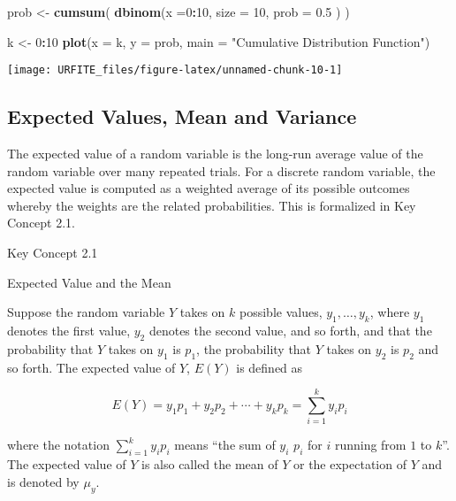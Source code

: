 \documentclass[]{book}
\newenvironment{Shaded}{\begin{snugshade}}{\end{snugshade}}
\newcommand{\KeywordTok}[1]{\textcolor[rgb]{0.13,0.29,0.53}{\textbf{#1}}}
\newcommand{\DataTypeTok}[1]{\textcolor[rgb]{0.13,0.29,0.53}{#1}}
\newcommand{\DecValTok}[1]{\textcolor[rgb]{0.00,0.00,0.81}{#1}}
\newcommand{\FloatTok}[1]{\textcolor[rgb]{0.00,0.00,0.81}{#1}}
\newcommand{\StringTok}[1]{\textcolor[rgb]{0.31,0.60,0.02}{#1}}
\newcommand{\OperatorTok}[1]{\textcolor[rgb]{0.81,0.36,0.00}{\textbf{#1}}}
\newcommand{\NormalTok}[1]{#1}
\theoremstyle{definition}
\theoremstyle{definition}
\theoremstyle{definition}
\theoremstyle{remark}
\begin{document}
\begin{Shaded}
\begin{Highlighting}[]
\NormalTok{prob <-}\StringTok{ }\KeywordTok{cumsum}\NormalTok{(}
              \KeywordTok{dbinom}\NormalTok{(}\DataTypeTok{x =}\DecValTok{0}\OperatorTok{:}\DecValTok{10}\NormalTok{, }
                     \DataTypeTok{size =} \DecValTok{10}\NormalTok{, }
                     \DataTypeTok{prob =} \FloatTok{0.5}
\NormalTok{                     )}
\NormalTok{              )}

\NormalTok{k <-}\StringTok{ }\DecValTok{0}\OperatorTok{:}\DecValTok{10} 
\KeywordTok{plot}\NormalTok{(}\DataTypeTok{x =}\NormalTok{ k, }
     \DataTypeTok{y =}\NormalTok{ prob,}
     \DataTypeTok{main =} \StringTok{"Cumulative Distribution Function"}\NormalTok{) }
\end{Highlighting}
\end{Shaded}

\begin{center}\texttt{[image: URFITE\_files/figure-latex/unnamed-chunk-10-1]} \end{center}

\subsection*{Expected Values, Mean and
Variance}\label{expected-values-mean-and-variance}

The expected value of a random variable is the long-run average value of
the random variable over many repeated trials. For a discrete random
variable, the expected value is computed as a weighted average of its
possible outcomes whereby the weights are the related probabilities.
This is formalized in Key Concept 2.1.

Key Concept 2.1

Expected Value and the Mean

Suppose the random variable \(Y\) takes on \(k\) possible values,
\(y_1, \dots, y_k\), where \(y_1\) denotes the first value, \(y_2\)
denotes the second value, and so forth, and that the probability that
\(Y\) takes on \(y_1\) is \(p_1\), the probability that \(Y\) takes on
\(y_2\) is \(p_2\) and so forth. The expected value of \(Y\), \(E(Y)\)
is defined as

\[ E(Y) = y_1 p_1 + y_2 p_2 + \cdots + y_k p_k = \sum_{i=1}^k y_i p_i \]

where the notation \(\sum_{i=1}^k y_i p_i\) means ``the sum of \(y_i\)
\(p_i\) for \(i\) running from \(1\) to \(k\)''. The expected value of
\(Y\) is also called the mean of \(Y\) or the expectation of \(Y\) and
is denoted by \(\mu_y\).
\end{document}

